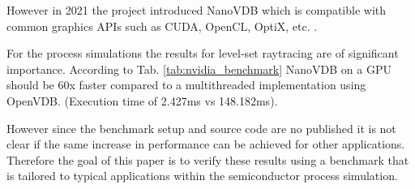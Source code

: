 However in 2021 the project introduced NanoVDB which is compatible with common graphics APIs such as CUDA, OpenCL, OptiX, etc. \cite{nanovdb}.


For the process simulations the results for level-set raytracing are of significant importance. 
According to Tab. \ref{tab:nvidia_benchmark} NanoVDB on a GPU should be 60x faster compared to a multithreaded implementation using OpenVDB. (Execution time of 2.427ms vs 148.182ms).

However since the benchmark setup and source code are no published it is not clear if the same increase in performance can be achieved for other applications.
Therefore the goal of this paper is to verify these results using a benchmark that is tailored to typical applications within the semiconductor process simulation.

